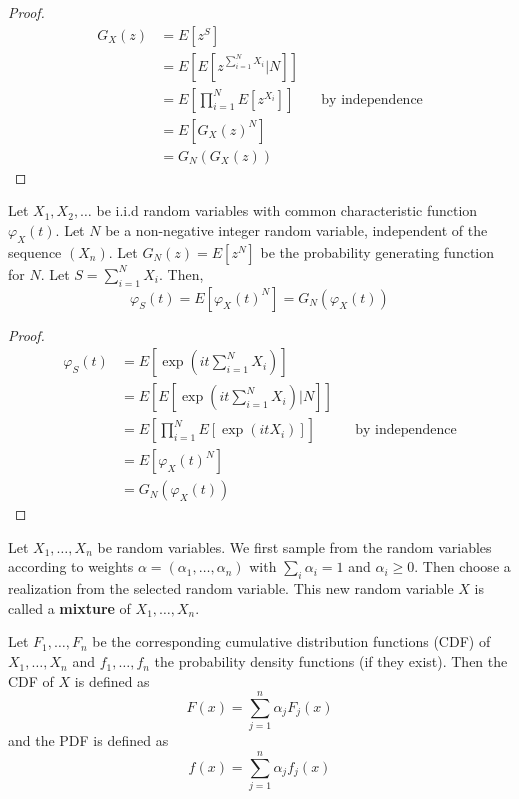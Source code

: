 \begin{proof}
\begin{align*}
    G_X(z) &= E[ z^S ]\\
    &= E[ E[ z^{\sum_{i = 1}^N X_i} | N ]]\\
    &= E \left[ \prod_{i = 1}^N E[z^{X_i}] \right] && \text{by independence}\\
    &= E[ G_X(z)^N]\\
    &= G_N(G_X(z))
\end{align*}
\end{proof}

\begin{theorem}\label{thm:char_func_random_sum}
Let $X_1, X_2, \ldots$ be i.i.d random variables with common characteristic function $\varphi_X(t)$.
Let $N$ be a non-negative integer random variable, independent of the sequence $(X_n)$.
Let $G_N(z) = E[z^N]$ be the probability generating function for $N$.
Let $S = \sum_{i = 1}^N X_i$.
Then,
$$
\varphi_S(t) = E[\varphi_X(t)^N] = G_N(\varphi_X(t))
$$
\end{theorem}

\begin{proof}
\begin{align*}
    \varphi_S(t) &= E[ \exp(it \sum_{i = 1}^N X_i) ]\\
    &= E[ E[ \exp(it \sum_{i = 1}^N X_i) | N ]]\\
    &= E \left[ \prod_{i = 1}^N E[\exp(it X_i)] \right] && \text{by independence}\\
    &= E[\varphi_X(t)^N]\\
    &= G_N(\varphi_X(t))
\end{align*}
\end{proof}

\begin{defn}
Let $X_1,\ldots, X_n$ be random variables.
We first sample from the random variables according to weights $\alpha = (\alpha_1, \ldots, \alpha_n)$ with $\sum_i \alpha_i = 1$ and $\alpha_i \geq 0$.
Then choose a realization from the selected random variable.
This new random variable $X$ is called a \textbf{mixture} of $X_1,\ldots, X_n$.

Let $F_1, \ldots, F_n$ be the corresponding cumulative distribution functions (CDF) of $X_1, \ldots, X_n$ and $f_1, \ldots, f_n$ the probability density functions (if they exist).
Then the CDF of $X$ is defined as
$$
F(x) = \sum_{j = 1}^n \alpha_j F_j(x)
$$
and the PDF is defined as
$$
f(x) = \sum_{j = 1}^n \alpha_j f_j(x)
$$
\end{defn}

